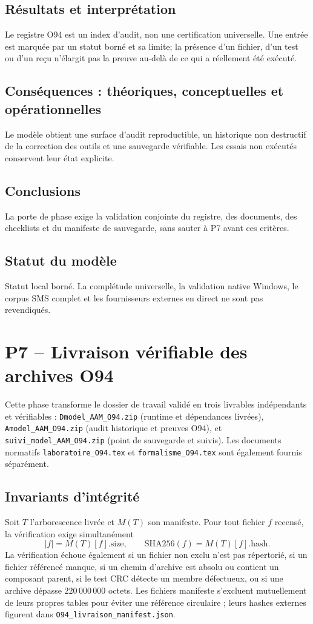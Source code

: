 \documentclass[11pt,a4paper]{article}
\begin{document}
\subsection{Résultats et interprétation}
Le registre O94 est un index d’audit, non une certification universelle. Une entrée est marquée par un statut borné et sa limite; la présence d’un fichier, d’un test ou d’un reçu n’élargit pas la preuve au-delà de ce qui a réellement été exécuté.
\subsection{Conséquences : théoriques, conceptuelles et opérationnelles}
Le modèle obtient une surface d’audit reproductible, un historique non destructif de la correction des outils et une sauvegarde vérifiable. Les essais non exécutés conservent leur état explicite.
\subsection{Conclusions}
La porte de phase exige la validation conjointe du registre, des documents, des checklists et du manifeste de sauvegarde, sans sauter à P7 avant ces critères.
\subsection{Statut du modèle}
Statut local borné. La complétude universelle, la validation native Windows, le corpus SMS complet et les fournisseurs externes en direct ne sont pas revendiqués.

\section{P7 -- Livraison vérifiable des archives O94}
Cette phase transforme le dossier de travail validé en trois livrables indépendants et vérifiables : \texttt{Dmodel\_AAM\_O94.zip} (runtime et dépendances livrées), \texttt{Amodel\_AAM\_O94.zip} (audit historique et preuves O94), et \texttt{suivi\_model\_AAM\_O94.zip} (point de sauvegarde et suivis). Les documents normatifs \texttt{laboratoire\_O94.tex} et \texttt{formalisme\_O94.tex} sont également fournis séparément.

\subsection{Invariants d'intégrité}
Soit $T$ l'arborescence livrée et $M(T)$ son manifeste. Pour tout fichier $f$ recensé, la vérification exige simultanément
\[
  |f|=M(T)[f].\mathrm{size}, \qquad
  \mathrm{SHA256}(f)=M(T)[f].\mathrm{hash}.
\]
La vérification échoue également si un fichier non exclu n'est pas répertorié, si un fichier référencé manque, si un chemin d'archive est absolu ou contient un composant parent, si le test CRC détecte un membre défectueux, ou si une archive dépasse $220\,000\,000$ octets. Les fichiers manifeste s'excluent mutuellement de leurs propres tables pour éviter une référence circulaire ; leurs hashes externes figurent dans \texttt{O94\_livraison\_manifest.json}.
\end{document}
